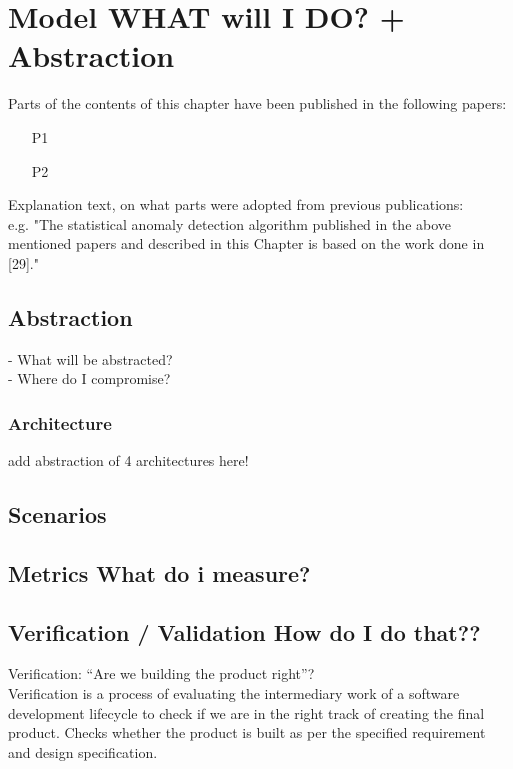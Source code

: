 \section{Model    \tiny{WHAT will I DO? + Abstraction}  } \label{sec:model}

\begin{Prev.Publ}
	Parts of the contents of this chapter have been published in the following papers:
	\begin{enumerate}
		\item [\lbrack P1\rbrack]  %
		\item [\lbrack P2\rbrack] 
	\end{enumerate}
	
	Explanation text, on what parts were adopted from previous publications:\\
	e.g. "The statistical anomaly detection algorithm published in the above mentioned papers and described in this
	Chapter is based on the work done in [29]."	
\end{Prev.Publ}

\subsection{Abstraction}
- What will be abstracted?\\
- Where do I compromise?\\


\subsubsection{Architecture} \label{subsec.architecture}
add abstraction of 4 architectures here!



\subsection{Scenarios} \label{subsec.scenarios}


\subsection{Metrics    \tiny{What do i measure?}  }


\subsection{Verification / Validation     \tiny{How do I do that??}  }
Verification: “Are we building the product right”?\\
Verification is a process of evaluating the intermediary work of a software development lifecycle to check if we are in the right track of creating the final product. Checks whether the product is built as per the specified requirement and design specification.\\

